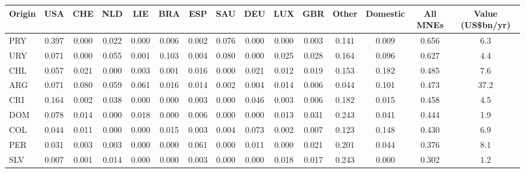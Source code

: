 \begin{tabular}{lcccccccccccccc}
\toprule
Origin & USA & CHE & NLD & LIE & BRA & ESP & SAU & DEU & LUX & GBR & Other & Domestic & All MNEs & Value (US\$bn/yr) \\
\midrule
PRY & 0.397 & 0.000 & 0.022 & 0.000 & 0.006 & 0.002 & 0.076 & 0.000 & 0.000 & 0.003 & 0.141 & 0.009 & 0.656 & 6.3 \\
URY & 0.071 & 0.000 & 0.055 & 0.001 & 0.103 & 0.004 & 0.080 & 0.000 & 0.025 & 0.028 & 0.164 & 0.096 & 0.627 & 4.4 \\
CHL & 0.057 & 0.021 & 0.000 & 0.003 & 0.001 & 0.016 & 0.000 & 0.021 & 0.012 & 0.019 & 0.153 & 0.182 & 0.485 & 7.6 \\
ARG & 0.071 & 0.080 & 0.059 & 0.061 & 0.016 & 0.014 & 0.002 & 0.004 & 0.014 & 0.006 & 0.044 & 0.101 & 0.473 & 37.2 \\
CRI & 0.164 & 0.002 & 0.038 & 0.000 & 0.000 & 0.003 & 0.000 & 0.046 & 0.003 & 0.006 & 0.182 & 0.015 & 0.458 & 4.5 \\
DOM & 0.078 & 0.014 & 0.000 & 0.018 & 0.000 & 0.006 & 0.000 & 0.000 & 0.013 & 0.031 & 0.243 & 0.041 & 0.444 & 1.9 \\
COL & 0.044 & 0.011 & 0.000 & 0.000 & 0.015 & 0.003 & 0.004 & 0.073 & 0.002 & 0.007 & 0.123 & 0.148 & 0.430 & 6.9 \\
PER & 0.031 & 0.003 & 0.003 & 0.000 & 0.000 & 0.061 & 0.000 & 0.011 & 0.000 & 0.021 & 0.201 & 0.044 & 0.376 & 8.1 \\
SLV & 0.007 & 0.001 & 0.014 & 0.000 & 0.000 & 0.003 & 0.000 & 0.000 & 0.018 & 0.017 & 0.243 & 0.000 & 0.302 & 1.2 \\
\bottomrule
\end{tabular}
